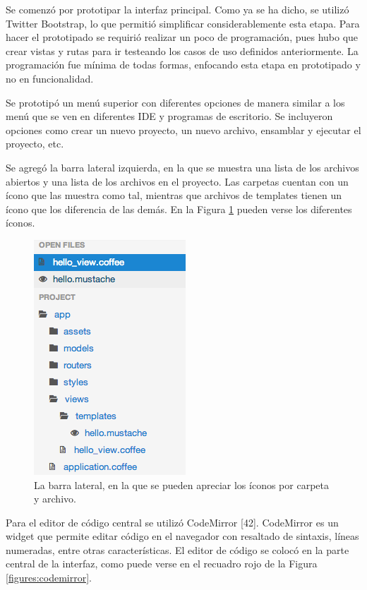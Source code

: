 \documentclass[12pt,spanish,letter]{report}
\makeatletter
\def\maxwidth{\ifdim\Gin@nat@width>\linewidth\linewidth
\else\Gin@nat@width\fi}
\let\Oldincludegraphics\includegraphics
\renewcommand{\includegraphics}[1]{\Oldincludegraphics[width=\maxwidth]{#1}}
\makeatother
\begin{document}
\label{section:prototyping}

Se comenzó por prototipar la interfaz principal. Como ya se ha dicho, se
utilizó Twitter Bootstrap, lo que permitió simplificar considerablemente
esta etapa. Para hacer el prototipado se requirió realizar un poco de
programación, pues hubo que crear vistas y rutas para ir testeando los
casos de uso definidos anteriormente. La programación fue mínima de
todas formas, enfocando esta etapa en prototipado y no en funcionalidad.

Se prototipó un menú superior con diferentes opciones de manera similar
a los menú que se ven en diferentes IDE y programas de escritorio. Se
incluyeron opciones como crear un nuevo proyecto, un nuevo archivo,
ensamblar y ejecutar el proyecto, etc.

Se agregó la barra lateral izquierda, en la que se muestra una lista de
los archivos abiertos y una lista de los archivos en el proyecto. Las
carpetas cuentan con un ícono que las muestra como tal, mientras que
archivos de templates tienen un ícono que los diferencia de las demás.
En la Figura \ref{figures:sidebar} pueden verse los diferentes íconos.

\begin{figure}[htbp]
\centering
\includegraphics{figures/sidebar.png}
\caption{La barra lateral, en la que se pueden apreciar los íconos por
carpeta y archivo. \label{figures:sidebar}}
\end{figure}

Para el editor de código central se utilizó CodeMirror {[}42{]}.
CodeMirror es un widget que permite editar código en el navegador con
resaltado de sintaxis, líneas numeradas, entre otras características. El
editor de código se colocó en la parte central de la interfaz, como
puede verse en el recuadro rojo de la Figura \ref{figures:codemirror}.
\end{document}
